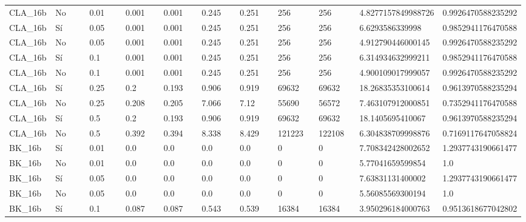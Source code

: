 {{\begin{longtable}{M{0.09\linewidth}M{0.09\linewidth}M{0.09\linewidth}M{0.09\linewidth}M{0.09\linewidth}M{0.09\linewidth}M{0.09\linewidth}M{0.09\linewidth}M{0.09\linewidth}M{0.09\linewidth}M{0.09\linewidth}}
CLA\_16b & No & \num{0.01} & \num{0.001} & \num{0.001} & \num{0.245} & \num{0.251} & \num{256} & \num{256} & \num{4.8277157849988726} & \num{0.9926470588235292} \\
CLA\_16b & Sí & \num{0.05} & \num{0.001} & \num{0.001} & \num{0.245} & \num{0.251} & \num{256} & \num{256} & \num{6.6293586339998} & \num{0.9852941176470588} \\
CLA\_16b & No & \num{0.05} & \num{0.001} & \num{0.001} & \num{0.245} & \num{0.251} & \num{256} & \num{256} & \num{4.912790446000145} & \num{0.9926470588235292} \\
CLA\_16b & Sí & \num{0.1} & \num{0.001} & \num{0.001} & \num{0.245} & \num{0.251} & \num{256} & \num{256} & \num{6.314934632999211} & \num{0.9852941176470588} \\
CLA\_16b & No & \num{0.1} & \num{0.001} & \num{0.001} & \num{0.245} & \num{0.251} & \num{256} & \num{256} & \num{4.900109017999057} & \num{0.9926470588235292} \\
CLA\_16b & Sí & \num{0.25} & \num{0.2} & \num{0.193} & \num{0.906} & \num{0.919} & \num{69632} & \num{69632} & \num{18.26835353100614} & \num{0.9613970588235294} \\
CLA\_16b & No & \num{0.25} & \num{0.208} & \num{0.205} & \num{7.066} & \num{7.12} & \num{55690} & \num{56572} & \num{7.463107912000851} & \num{0.7352941176470588} \\
CLA\_16b & Sí & \num{0.5} & \num{0.2} & \num{0.193} & \num{0.906} & \num{0.919} & \num{69632} & \num{69632} & \num{18.1405695410067} & \num{0.9613970588235294} \\
CLA\_16b & No & \num{0.5} & \num{0.392} & \num{0.394} & \num{8.338} & \num{8.429} & \num{121223} & \num{122108} & \num{6.304838709998876} & \num{0.7169117647058824} \\
BK\_16b & Sí & \num{0.01} & \num{0.0} & \num{0.0} & \num{0.0} & \num{0.0} & \num{0} & \num{0} & \num{7.708342428002652} & \num{1.2937743190661477} \\
BK\_16b & No & \num{0.01} & \num{0.0} & \num{0.0} & \num{0.0} & \num{0.0} & \num{0} & \num{0} & \num{5.77041659599854} & \num{1.0} \\
BK\_16b & Sí & \num{0.05} & \num{0.0} & \num{0.0} & \num{0.0} & \num{0.0} & \num{0} & \num{0} & \num{7.63831131400002} & \num{1.2937743190661477} \\
BK\_16b & No & \num{0.05} & \num{0.0} & \num{0.0} & \num{0.0} & \num{0.0} & \num{0} & \num{0} & \num{5.56085569300194} & \num{1.0} \\
BK\_16b & Sí & \num{0.1} & \num{0.087} & \num{0.087} & \num{0.543} & \num{0.539} & \num{16384} & \num{16384} & \num{3.950296184000763} & \num{0.9513618677042802} \\

\end{longtable}}}
